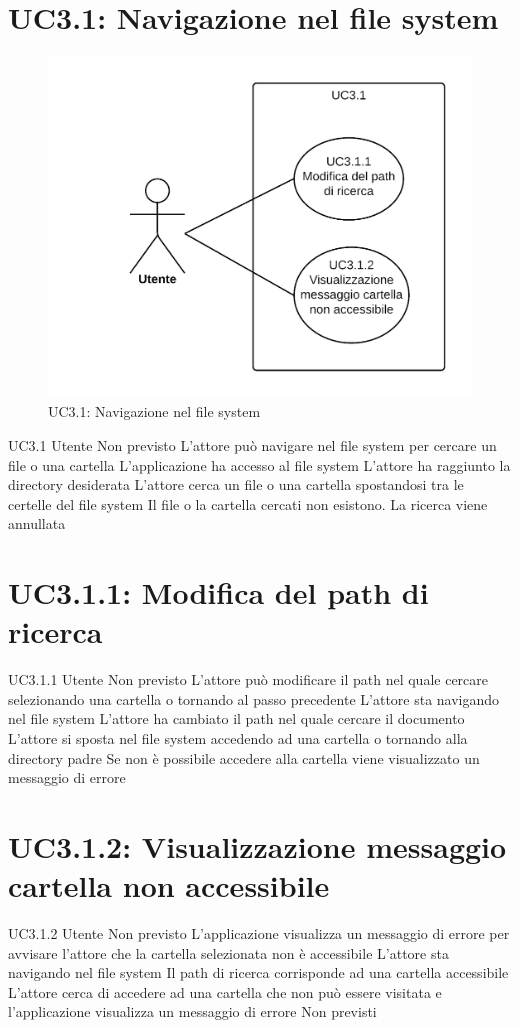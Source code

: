 \documentclass[../AnalisideiRequisiti.tex]{subfiles}
\begin{document}
	\section{UC3.1: Navigazione nel file system}
	\begin{figure}[H]
		\centering
		\includegraphics[width=\textwidth]{../img/UC3_1.png}
		\caption{UC3.1: Navigazione nel file system}
	\end{figure}
	\UserCase
	{UC3.1}
	{Utente}
	{Non previsto}
	{L'attore può navigare nel file system per cercare un file o una cartella}
	{L'applicazione ha accesso al file system}
	{L'attore ha raggiunto la directory desiderata}
	{
		L'attore cerca un file o una cartella spostandosi tra le
		certelle del file system
	}
	{Il file o la cartella cercati non esistono. La ricerca viene annullata}	
	
	\section{UC3.1.1: Modifica del path di ricerca}
	\UserCase
	{UC3.1.1}
	{Utente}
	{Non previsto}
	{L'attore può modificare il path nel quale cercare selezionando una cartella o tornando al passo precedente}
	{L'attore sta navigando nel file system }
	{L'attore ha cambiato il path nel quale cercare il documento}
	{L'attore si sposta nel file system accedendo ad una cartella o tornando alla directory padre}
	{Se non è possibile accedere alla cartella viene visualizzato un messaggio di errore }
	
	\section{UC3.1.2: Visualizzazione messaggio cartella non accessibile}
	\UserCase
	{UC3.1.2}
	{Utente}
	{Non previsto}
	{L'applicazione visualizza un messaggio di errore per avvisare l'attore che la cartella selezionata non è accessibile}
	{L'attore sta navigando nel file system }
	{Il path di ricerca corrisponde ad una cartella accessibile}
	{L'attore cerca di accedere ad una cartella che non può essere visitata e l'applicazione visualizza un messaggio di errore}
	{Non previsti}
\end{document}
